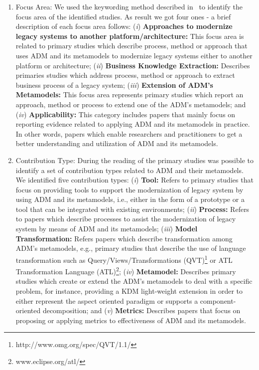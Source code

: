 \begin{enumerate}

\item Focus Area: We used the keywording method described in~\cite{Petersen:2008:SMS:2227115.2227123} to identify the focus area of the identified studies. As result we got four ones - a brief description of each focus area follows: (\textit{i}) \textbf{Approaches to modernize legacy systems to another platform/architecture:} This focus area is related to primary studies which describe process, method or approach that uses ADM and its metamodels to modernize legacy systems either to another platform  or architecture; (\textit{ii}) \textbf{Business Knowledge Extraction:} Describes primaries studies which address process, method or approach to extract business process of a legacy system; (\textit{iii}) \textbf{Extension of ADM's Metamodels:} This focus area represents primary studies which report an approach, method or process to extend one of the ADM's metamodels; and (\textit{iv}) \textbf{Applicability:} This category includes papers that mainly focus on reporting evidence related to applying ADM and its metamodels in practice. In other words, papers which enable researchers and practitioners to get a better understanding and utilization of ADM and its metamodels.

\item Contribution Type: During the reading of the primary studies was possible to identify a set of contribution types related to ADM and their metamodels. We identified five contribution types: (\textit{i}) \textbf{Tool:} Refers to primary studies that focus on providing tools to support the modernization of legacy system by using ADM and its metamodels, i.e., either in the form of a prototype or a tool that can be integrated with existing environments; (\textit{ii}) \textbf{Process:} Refers to papers which describe processes to assist the modernization of legacy system by means of ADM and its metamodels; (\textit{iii}) \textbf{Model Transformation:} Refers papers which describe transformation among ADM's metamodels, e.g., primary studies that describe the use of language transformation such as Query/Views/Transformations (QVT)\footnote{http://www.omg.org/spec/QVT/1.1/} or ATL Transformation Language (ATL)\footnote{www.eclipse.org/atl/}; (\textit{iv}) \textbf{Metamodel:} Describes primary studies which create or extend the ADM's metamodels to deal with a specific problem, for instance, providing a KDM light-weight extension in order to either represent the aspect oriented paradigm or supports a component-oriented decomposition; and (\textit{v}) \textbf{Metrics:} Describes papers that focus on proposing or applying metrics to effectiveness of ADM and its metamodels.


\end{enumerate}
